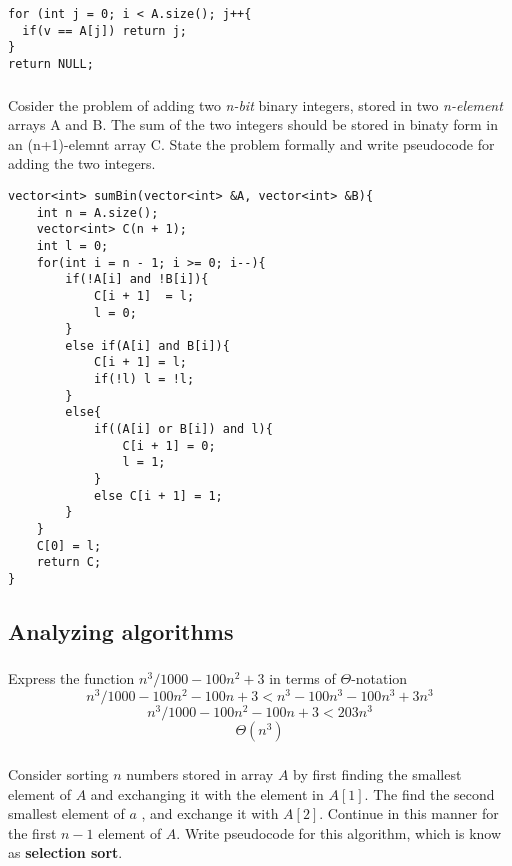 \documentclass[a4paper,12pt]{article}
\begin{document}
    \begin{lstlisting}
for (int j = 0; i < A.size(); j++{
  if(v == A[j]) return j;
}
return NULL;
    \end{lstlisting}
    
    \subsubsection{} Cosider the problem of adding two \textit{n-bit}
    binary integers, stored in two \textit{n-element} arrays A and B. The sum
     of the two integers should be stored in binaty form in an (n+1)-elemnt array C.
     State the problem formally and write pseudocode for adding the two integers.
     
     \begin{lstlisting}
vector<int> sumBin(vector<int> &A, vector<int> &B){
	int n = A.size();
	vector<int> C(n + 1);
	int l = 0;
	for(int i = n - 1; i >= 0; i--){
		if(!A[i] and !B[i]){
			C[i + 1]  = l;
			l = 0; 
		}
		else if(A[i] and B[i]){
			C[i + 1] = l;
			if(!l) l = !l;
		}
		else{
			if((A[i] or B[i]) and l){
				C[i + 1] = 0;
				l = 1;
			}
			else C[i + 1] = 1;
		}
	}
	C[0] = l;
	return C;
}
     \end{lstlisting}

  \subsection{Analyzing algorithms}
    \subsubsection{} Express the function $n^3/1000-100n^2+3$ in
   terms of $\Theta$-notation \\
   
  $$n^3/1000 - 100n^2 - 100n + 3 < n^3 - 100n^3 - 100n^3 + 3n^3$$
  $$n^3/1000 - 100n^2 - 100n + 3 < 203n^3$$
  $$\Theta(n^3)$$
  
    \subsubsection{} Consider sorting $n$ numbers stored in array $A$
    by first finding the smallest element of $A$ and exchanging it with
    the element in $A[1]$. The find the second smallest element of $a$
    , and exchange it with $A[2]$. Continue in this manner for the first $n-1$
    element of $A$. Write pseudocode for this algorithm, which is know as 
    \textbf{selection sort}.
    
\end{document}
